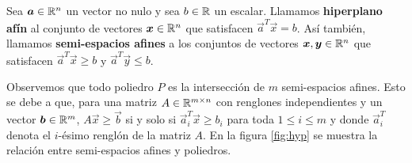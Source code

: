 
\begin{definition}
	Sea $\boldsymbol{a} \in \mathbb{R}^n$ un vector no nulo y sea $b \in \mathbb{R}$ un escalar. Llamamos
	\textbf{hiperplano afín}
	al conjunto de vectores $\boldsymbol{x} \in \mathbb{R}^n$ que satisfacen $\vec{a}^T\vec{x} = b$. Así también,
	llamamos \textbf{semi-espacios afines} a los conjuntos de vectores $\boldsymbol{x}, \boldsymbol{y} \in \mathbb{R}^n$ que
	satisfacen $\vec{a}^T\vec{x} \geq b$ y $\vec{a}^T\vec{y} \leq b$.
\end{definition}

Observemos que todo poliedro $P$ es la intersección de $m$ semi-espacios afines. Esto se debe a que,
para una matriz $A \in \mathbb{R}^{m \times n}$ con renglones independientes y un vector $\boldsymbol{b} \in \mathbb{R}^m$,
$A\vec{x} \geq \vec{b}$ si y solo si $\vec{a}_i^T\vec{x} \geq b_i$ para toda $1 \leq i \leq m$ y
donde $\vec{a}_i^T$ denota el $i$-ésimo renglón de la matriz $A$. En la figura \ref{fig:hyp} se
muestra la relación entre semi-espacios afines y poliedros.

